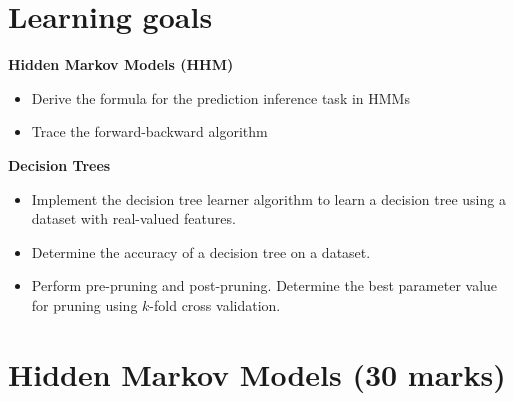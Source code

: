 \documentclass[12pt]{article}
\begin{document}
\section*{Learning goals}

{\bf Hidden Markov Models (HHM)}
\begin{itemize}
    \item Derive the formula for the prediction inference task in HMMs
    \item Trace the forward-backward algorithm
\end{itemize}

{\bf Decision Trees}
\begin{itemize}
\item 
Implement the decision tree learner algorithm to learn a decision tree using a dataset with real-valued features.
\item
Determine the accuracy of a decision tree on a dataset.
\item
Perform pre-pruning and post-pruning. Determine the best parameter value for pruning using $k$-fold cross validation.
\end{itemize}




\newpage
\section{Hidden Markov Models (30 marks)}
\label{question_hmm}
\end{document}
